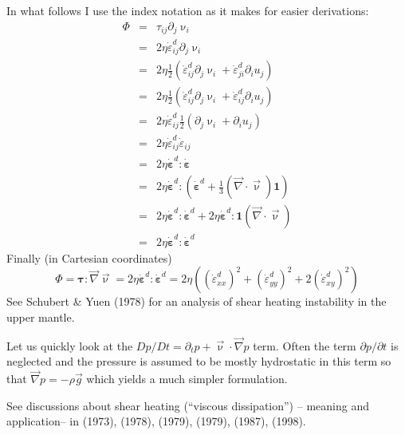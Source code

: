 In what follows I use the index notation as it makes for easier derivations:
\begin{eqnarray}
\Phi 
&=& \tau_{ij}\partial_j \upnu_i \nonumber\\
&=& 2 \eta \dot{\varepsilon}_{ij}^d\partial_j \upnu_i \nonumber\\
&=& 2 \eta \frac{1}{2}\left( \dot{\varepsilon}_{ij}^d\partial_j \upnu_i + \dot{\varepsilon}_{ji}^d\partial_i u_j \right) \nonumber\\
&=& 2 \eta \frac{1}{2}\left( \dot{\varepsilon}_{ij}^d\partial_j \upnu_i + \dot{\varepsilon}_{ij}^d\partial_i u_j \right) \nonumber\\
&=& 2 \eta  \dot{\varepsilon}_{ij}^d  \frac{1}{2}\left(\partial_j \upnu_i + \partial_i u_j \right) \nonumber\\
&=& 2 \eta  \dot{\varepsilon}_{ij}^d   \dot{\varepsilon}_{ij} \nonumber\\
&=& 2 \eta  \dot{\bm \varepsilon}^d :  \dot{\bm \varepsilon} \nonumber\\
&=& 2 \eta  \dot{\bm \varepsilon}^d : \left( \dot{\bm \varepsilon}^d +\frac{1}{3} ({\vec \nabla}\cdot{\vec \upnu}) {\bm 1} \right)\nonumber\\
&=& 2 \eta  \dot{\bm \varepsilon}^d : \dot{\bm \varepsilon}^d 
+ 2 \eta  \dot{\bm \varepsilon}^d : {\bm 1} ({\vec \nabla}\cdot{\vec \upnu}) \nonumber\\ 
&=& 2 \eta  \dot{\bm \varepsilon}^d : \dot{\bm \varepsilon}^d \label{eq:physicsshearheating} 
\end{eqnarray}
Finally (in Cartesian coordinates)
\begin{equation}
\Phi = {\bm \tau}:{\vec \nabla}{\vec \upnu} = 2 \eta  \dot{\bm \varepsilon}^d : \dot{\bm \varepsilon}^d
= 2 \eta \left( (\dot{\varepsilon}_{xx}^d)^2 + (\dot{\varepsilon}_{yy}^d)^2 + 2(\dot{\varepsilon}_{xy}^d)^2 \right) 
\end{equation}
See Schubert \& Yuen (1978) \cite{scyu78} for an analysis of shear heating instability in the upper mantle.

Let us quickly look at the $Dp/Dt=\partial_t p + \vec\upnu\cdot\vec\nabla p$ term. 
Often the term $\partial p/\partial t$
is neglected and the pressure is assumed to be mostly hydrostatic in this term so 
that $\vec\nabla p = - \rho \vec{g}$ which yields a much simpler formulation. 

See discussions about shear heating (``viscous dissipation'') -- meaning and application-- in 
\textcite{froi73} (1973),
\textcite{stei78} (1978),
\textcite{biyu79} (1979),
\textcite{slsg79} (1979),
\textcite{wint87} (1987),
\textcite{madu98} (1998).

